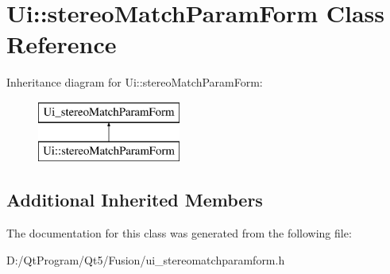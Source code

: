 \hypertarget{class_ui_1_1stereo_match_param_form}{}\section{Ui\+:\+:stereo\+Match\+Param\+Form Class Reference}
\label{class_ui_1_1stereo_match_param_form}
Inheritance diagram for Ui\+:\+:stereo\+Match\+Param\+Form\+:\begin{figure}[H]
\begin{center}
\leavevmode
\includegraphics[height=2.000000cm]{class_ui_1_1stereo_match_param_form}
\end{center}
\end{figure}
\subsection*{Additional Inherited Members}


The documentation for this class was generated from the following file\+:\begin{DoxyCompactItemize}
\item 
D\+:/\+Qt\+Program/\+Qt5/\+Fusion/ui\+\_\+stereomatchparamform.\+h\end{DoxyCompactItemize}
